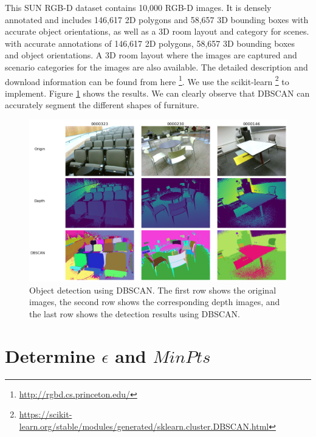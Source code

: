 This SUN RGB-D dataset contains 10,000 RGB-D images. It is densely annotated and includes 146,617 2D polygons and 58,657 3D bounding boxes with accurate object orientations, as well as a 3D room layout and category for scenes.
with accurate annotations of 146,617 2D polygons, 58,657 3D bounding boxes and object orientations. A 3D room layout where the images are captured and scenario categories for the images are also available. 
The detailed description and download information can be found from here 
\footnote{\url{http://rgbd.cs.princeton.edu/}}. We use the scikit-learn 
\footnote{\url{https://scikit-learn.org/stable/modules/generated/sklearn.cluster.DBSCAN.html}}
to implement. Figure \ref{fig:scene} shows the results. We can clearly observe 
that DBSCAN can accurately segment the different shapes of furniture. 
\begin{figure}[h!]
	\label{fig:scene}
\includegraphics[width=\textwidth]{"figures/segment.png"}
\caption{Object detection using DBSCAN. The first row shows the original 
images, the second row shows the corresponding depth images, and the last row 
shows the detection results using DBSCAN.}
\end{figure}

\section{Determine $\epsilon$ and $MinPts$}

